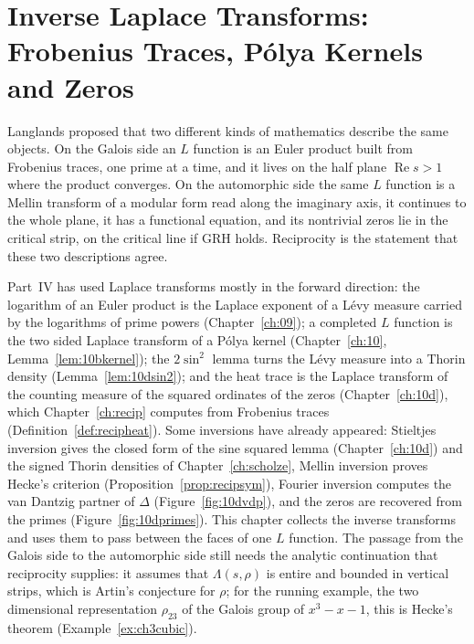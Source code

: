 \chapter[Inverse Laplace Transforms]{Inverse Laplace Transforms:\\ Frobenius Traces, P\'olya Kernels\\ and Zeros}\label{ch:lap}

Langlands proposed that two different kinds of mathematics describe the same objects. On the Galois side an $L$ function is an Euler product built from Frobenius traces, one prime at a time, and it lives on the half plane $\operatorname{Re}s>1$ where the product converges. On the automorphic side the same $L$ function is a Mellin transform of a modular form read along the imaginary axis, it continues to the whole plane, it has a functional equation, and its nontrivial zeros lie in the critical strip, on the critical line if GRH holds. Reciprocity is the statement that these two descriptions agree.

Part~IV has used Laplace transforms mostly in the forward direction: the logarithm of an Euler product is the Laplace exponent of a L\'evy measure carried by the logarithms of prime powers (Chapter~\ref{ch:09}); a completed $L$ function is the two sided Laplace transform of a P\'olya kernel (Chapter~\ref{ch:10}, Lemma~\ref{lem:10bkernel}); the $2\sin^2$ lemma turns the L\'evy measure into a Thorin density (Lemma~\ref{lem:10dsin2}); and the heat trace is the Laplace transform of the counting measure of the squared ordinates of the zeros (Chapter~\ref{ch:10d}), which Chapter~\ref{ch:recip} computes from Frobenius traces (Definition~\ref{def:recipheat}). Some inversions have already appeared: Stieltjes inversion gives the closed form of the sine squared lemma (Chapter~\ref{ch:10d}) and the signed Thorin densities of Chapter~\ref{ch:scholze}, Mellin inversion proves Hecke's criterion (Proposition~\ref{prop:recipsym}), Fourier inversion computes the van Dantzig partner of $\Delta$ (Figure~\ref{fig:10dvdp}), and the zeros are recovered from the primes (Figure~\ref{fig:10dprimes}). This chapter collects the inverse transforms and uses them to pass between the faces of one $L$ function. The passage from the Galois side to the automorphic side still needs the analytic continuation that reciprocity supplies: it assumes that $\Lambda(s,\rho)$ is entire and bounded in vertical strips, which is Artin's conjecture for $\rho$; for the running example, the two dimensional representation $\rho_{23}$ of the Galois group of $x^3-x-1$, this is Hecke's theorem (Example~\ref{ex:ch3cubic}).

